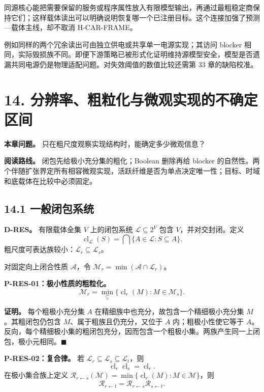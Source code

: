 \documentclass[
  11pt,
  oneside]{book}
\begin{document}
同源核心能把需要保留的服务或程序属性放入有限模型输出，再通过最粗稳定商保持它们；这样载体读出可以明确说明恢复哪一个已注册目标。这个连接加强了预测---载体主线，却不取消 H-CAR-FRAME。

例如同样的两个冗余读出可由独立供电或共享单一电源实现；其访问 blocker 相同，实际毁损族不同。即便下游策略已被形式化证明维持源模型安全，模型是否遗漏共同电源仍是物理适配问题。对失效阈值的数值比较还需第 33 章的缺陷校准。

\chapter{14. 分辨率、粗粒化与微观实现的不确定区间}\label{ch-14}

\textbf{本章问题。} 只在粗尺度观察实现结构时，能确定多少微观信息？

\textbf{阅读路线。} 闭包先给极小充分集的粗化；Boolean 删除再给 blocker 的自然性。两个伴随扩张界定所有相容微观实现，活跃纤维是否为单点决定唯一性；目标、时域和底载体在比较中必须固定。

\section{14.1 一般闭包系统}\label{ux4e00ux822cux95edux5305ux7cfbux7edf}

\textbf{D-RES。} 有限载体全集 \(V\) 上的闭包系统 \(\mathcal L\subseteq2^V\) 包含 \(V\)，并对交封闭。定义 \[\operatorname{cl}_{\mathcal L}(S)=
\bigcap\{A\in\mathcal L:S\subseteq A\}.\] 粗尺度可表达族较小：\(\mathcal L_r\subseteq\mathcal L_s\)。

对固定向上闭合性质 \(\mathcal A\)，令 \(\mathcal M_r=\min(\mathcal A\cap\mathcal L_r)\)。

\hypertarget{p-res-01}{}\label{p-res-01}

\textbf{P-RES-01：极小性质的粗粒化。} \[\mathcal M_r=
\min_{\subseteq}\{\operatorname{cl}_r(M):M\in\mathcal M_s\}.\]

\textbf{证明。} 每个粗极小充分集 \(A\) 在精细族中也充分，故包含一个精细极小充分集 \(M\)。其粗闭包仍包含 \(M\)、属于粗族且仍充分，又位于 \(A\) 内；粗极小性使它等于 \(A\)。反向，每个精细极小集的粗闭包充分，因而包含一个粗极小集。两族产生同一上闭包，极小元相同。\(\blacksquare\)

\hypertarget{p-res-02}{}\label{p-res-02}

\textbf{P-RES-02：复合律。} 若 \(\mathcal L_r\subseteq\mathcal L_s\subseteq\mathcal L_t\)，则 \[\operatorname{cl}_r\operatorname{cl}_s=\operatorname{cl}_r.\] 在极小集合族上定义 \(\mathcal R_{r\leftarrow s}(\mathcal M)=
\min\{\operatorname{cl}_r(M):M\in\mathcal M\}\)，则 \[\mathcal R_{r\leftarrow t}
=\mathcal R_{r\leftarrow s}\mathcal R_{s\leftarrow t}.\]
\end{document}

